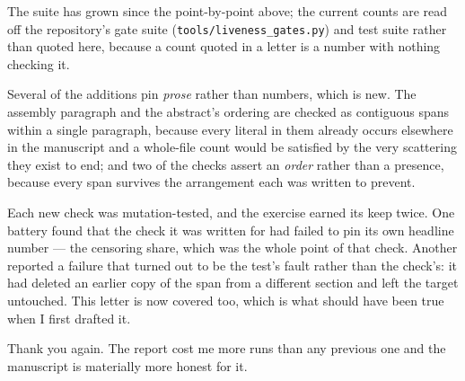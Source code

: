 \documentclass[11pt]{article}
\begin{document}
The suite has grown since the point-by-point above; the current counts are read off
the repository's gate suite (\texttt{tools/liveness\_gates.py}) and test suite rather
than quoted here, because a count quoted in a letter is a number with nothing checking it.

Several of the additions pin \emph{prose} rather than numbers, which is new. The
assembly paragraph and the abstract's ordering are checked as contiguous spans within
a single paragraph, because every literal in them already occurs elsewhere in the
manuscript and a whole-file count would be satisfied by the very scattering they exist
to end; and two of the checks assert an \emph{order} rather than a presence, because
every span survives the arrangement each was written to prevent.

Each new check was mutation-tested, and the exercise earned its keep twice. One
battery found that the check it was written for had failed to pin its own headline
number --- the censoring share, which was the whole point of that check. Another
reported a failure that turned out to be the test's fault rather than the check's: it
had deleted an earlier copy of the span from a different section and left the target
untouched. This letter is now covered too, which is what should have been true when I
first drafted it.

\vspace{1em}
\noindent Thank you again. The report cost me more runs than any previous one and
the manuscript is materially more honest for it.
\end{document}
